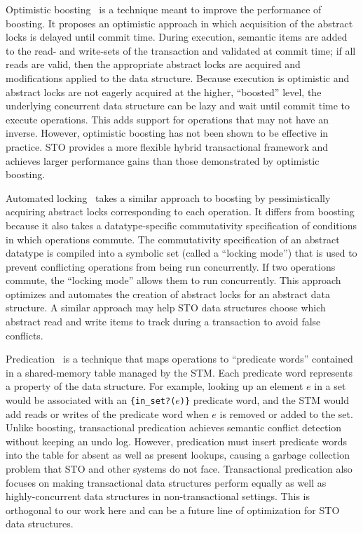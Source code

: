 Optimistic boosting~\cite{optboost} is a technique meant to improve the performance of boosting. It proposes an optimistic approach in which acquisition of the abstract locks is delayed until commit time. During execution, semantic items are added to the read- and write-sets of the transaction and validated at commit time; if all reads are valid, then the appropriate abstract locks are acquired and modifications applied to the data structure. Because execution is optimistic and abstract locks are not eagerly acquired at the higher, ``boosted'' level, the underlying concurrent data structure can be lazy and wait until commit time to execute operations. This adds support for operations that may not have an inverse. 
However, optimistic boosting has not been shown to be effective in practice. STO provides a more flexible hybrid transactional framework and achieves larger performance gains than those demonstrated by optimistic boosting.

Automated locking~\cite{autolock} takes a similar approach to boosting by pessimistically acquiring abstract locks corresponding to each operation. It differs from boosting because it also takes a datatype-specific commutativity specification of conditions in which operations commute. The commutativity specification of an abstract datatype is compiled into a symbolic set (called a ``locking mode'') that is used to prevent conflicting operations from being run concurrently. If two operations commute, the ``locking mode'' allows them to run concurrently.
This approach optimizes and automates the creation of abstract locks for an abstract data structure. A similar approach may help STO data structures choose which abstract read and write items to track during a transaction to avoid false conflicts.

Predication~\cite{predication} is a technique that maps operations to ``predicate words'' contained in a shared-memory table managed by the STM. Each predicate word represents a property of the data structure. For example, looking up an element $e$ in a set would be associated with an \texttt{\{in\_set?($e$)\}} predicate word, and the STM would add reads or writes of the predicate word when $e$ is removed or added to the set. 
Unlike boosting, transactional predication achieves semantic conflict detection without keeping an undo log. However, predication must insert predicate words into the table for absent as well as present lookups, causing a garbage collection problem that STO and other systems do not face. Transactional predication also focuses on making transactional data structures perform equally as well as highly-concurrent data structures in non-transactional settings. This is orthogonal to our work here and can be a future line of optimization for STO data structures.

